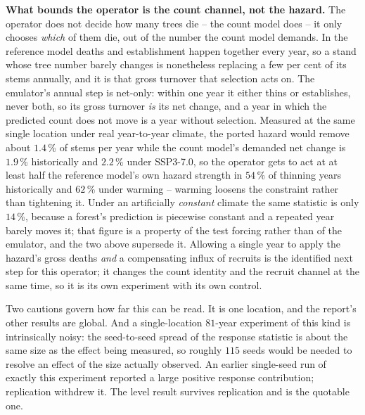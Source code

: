 \documentclass[11pt]{article}
\begin{document}
\textbf{What bounds the operator is the count channel, not the hazard.} The operator does not decide how many trees die -- the count model does -- it only chooses \emph{which} of them die, out of the number the count model demands. In the reference model deaths and establishment happen together every year, so a stand whose tree number barely changes is nonetheless replacing a few per cent of its stems annually, and it is that gross turnover that selection acts on. The emulator's annual step is net-only: within one year it either thins or establishes, never both, so its gross turnover \emph{is} its net change, and a year in which the predicted count does not move is a year without selection. Measured at the same single location under real year-to-year climate, the ported hazard would remove about $1.4$\,\% of stems per year while the count model's demanded net change is $1.9$\,\% historically and $2.2$\,\% under SSP3-7.0, so the operator gets to act at at least half the reference model's own hazard strength in $54$\,\% of thinning years historically and $62$\,\% under warming -- warming loosens the constraint rather than tightening it. Under an artificially \emph{constant} climate the same statistic is only $14$\,\%, because a forest's prediction is piecewise constant and a repeated year barely moves it; that figure is a property of the test forcing rather than of the emulator, and the two above supersede it. Allowing a single year to apply the hazard's gross deaths \emph{and} a compensating influx of recruits is the identified next step for this operator; it changes the count identity and the recruit channel at the same time, so it is its own experiment with its own control.

Two cautions govern how far this can be read. It is one location, and the report's other results are global. And a single-location $81$-year experiment of this kind is intrinsically noisy: the seed-to-seed spread of the response statistic is about the same size as the effect being measured, so roughly $115$ seeds would be needed to resolve an effect of the size actually observed. An earlier single-seed run of exactly this experiment reported a large positive response contribution; replication withdrew it. The level result survives replication and is the quotable one.
\end{document}
